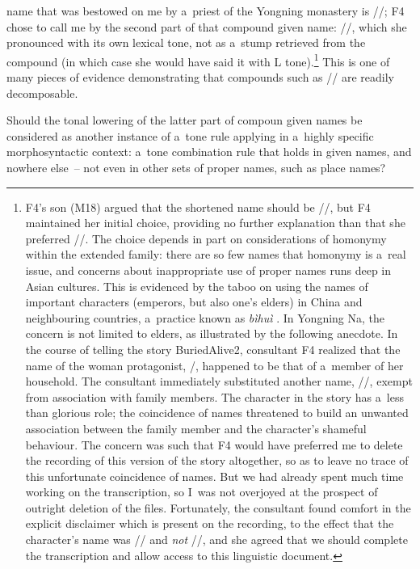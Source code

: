 name that was bestowed on me by a~priest of the Yongning monastery is //; F4 chose to call me by the second part of that compound given name: //, which she pronounced with its own lexical tone, not as a~stump retrieved from the compound (in which case she would have said it with L tone).\footnote{F4's son (M18) argued that the shortened name should be //, but F4 maintained her initial choice, providing no further explanation than that she preferred //. The choice depends in part on considerations of homonymy within the extended family: there are so few names that homonymy is a~real issue, and concerns about inappropriate use of proper names runs deep in Asian cultures. This is evidenced by the taboo on using the names of important characters (emperors, but also one's elders) in China and neighbouring countries, a~practice known as \textit{bìhuì}  \citep[studied in detail by][]{adamek2012}. In Yongning Na, the concern is not limited to elders, as illustrated by the following anecdote. In the course of telling the story BuriedAlive2, consultant F4 realized that the name of the woman protagonist, /, happened to be that of a~member of her household. The consultant immediately substituted another name, //, exempt from association with family members. The character in the story has a~less than glorious role; the coincidence of names threatened to build an unwanted association between the family member and the character's shameful behaviour. The concern was such that F4 would have preferred me to delete the recording of this version of the story altogether, so as to leave no trace of this unfortunate coincidence of names. But we had already spent much time working on the transcription, so I~was not overjoyed at the prospect of outright deletion of the files. Fortunately, the consultant found comfort in the explicit disclaimer which is present on the recording, to the effect that the character's name was // and \textit{not} //, and she agreed that we should complete the transcription and allow access to this linguistic document.} This is one of many pieces of evidence demonstrating that compounds such as // are readily decomposable. 

Should the tonal lowering of the latter part of compoun given names be considered as another instance of a~tone rule applying in a~highly specific morphosyntactic context: a~tone combination rule that holds in given names, and nowhere else~-- not even in other sets of proper names, such as place names?

